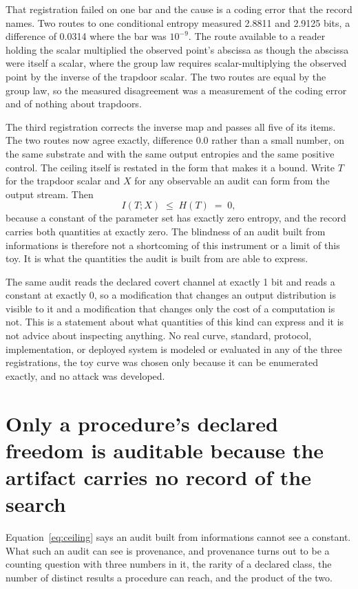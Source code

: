 \documentclass[aps,pre,reprint,nofootinbib]{revtex4-2}
\begin{document}
That registration failed on one bar and the cause is a coding error
that the record names.  Two routes to one conditional entropy measured
2.8811 and 2.9125 bits, a difference of 0.0314 where the bar was
$10^{-9}$.  The route available to a reader holding the scalar
multiplied the observed point's abscissa as though the abscissa were
itself a scalar, where the group law requires scalar-multiplying the
observed point by the inverse of the trapdoor scalar.  The two routes
are equal by the group law, so the measured disagreement was a
measurement of the coding error and of nothing about trapdoors.

The third registration corrects the inverse map and passes all five of
its items.  The two routes now agree exactly, difference $0.0$ rather
than a small number, on the same substrate and with the same output
entropies and the same positive control.  The ceiling itself is
restated in the form that makes it a bound.  Write $T$ for the
trapdoor scalar and $X$ for any observable an audit can form from the
output stream.  Then
\begin{equation}
  I(T; X) \;\le\; H(T) \;=\; 0,
  \label{eq:ceiling}
\end{equation}
because a constant of the parameter set has exactly zero entropy, and
the record carries both quantities at exactly zero.  The blindness of
an audit built from informations is therefore not a shortcoming of
this instrument or a limit of this toy.  It is what the quantities the
audit is built from are able to express.

The same audit reads the declared covert channel at exactly 1 bit and
reads a constant at exactly 0, so a modification that changes an
output distribution is visible to it and a modification that changes
only the cost of a computation is not.  This is a statement about
what quantities of this kind can express and it is not advice about
inspecting anything.  No real curve, standard, protocol,
implementation, or deployed system is modeled or evaluated in any of
the three registrations, the toy curve was chosen only because it can
be enumerated exactly, and no attack was developed.

\section{Only a procedure's declared freedom is auditable because the
artifact carries no record of the search}
\label{sec:cr5}

Equation~\eqref{eq:ceiling} says an audit built from informations
cannot see a constant.  What such an audit can see is provenance, and
provenance turns out to be a counting question with three numbers in
it, the rarity of a declared class, the number of distinct results a
procedure can reach, and the product of the two.
\end{document}
